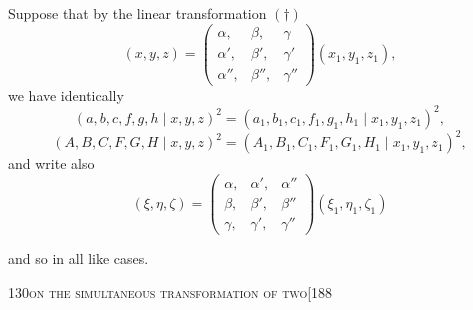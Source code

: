 \documentclass[11pt]{article}
\begin{document}
Suppose that by the linear transformation $(\dagger)$
\[
(x,y,z) = \left(\begin{array}{ccc} \alpha, & \beta, & \gamma\\ \alpha', & \beta', & \gamma'\\ \alpha'', & \beta'', & \gamma'' \end{array}\right)\!(x_{1},y_{1},z_{1}),
\]
we have identically
\[
(a,b,c,f,g,h\mid x,y,z)^{2} = (a_{1},b_{1},c_{1},f_{1},g_{1},h_{1}\mid x_{1},y_{1},z_{1})^{2},
\]
\[
(A,B,C,F,G,H\mid x,y,z)^{2} = (A_{1},B_{1},C_{1},F_{1},G_{1},H_{1}\mid x_{1},y_{1},z_{1})^{2},
\]
and write also
\[
(\xi,\eta,\zeta) = \left(\begin{array}{ccc} \alpha, & \alpha', & \alpha''\\ \beta, & \beta', & \beta''\\ \gamma, & \gamma', & \gamma'' \end{array}\right)\!(\xi_{1},\eta_{1},\zeta_{1})
\]


and so in all like cases.

\begin{center}\small\textsc{130}\hfill\textsc{on the simultaneous transformation of two}\hfill[188\end{center}
\end{document}
